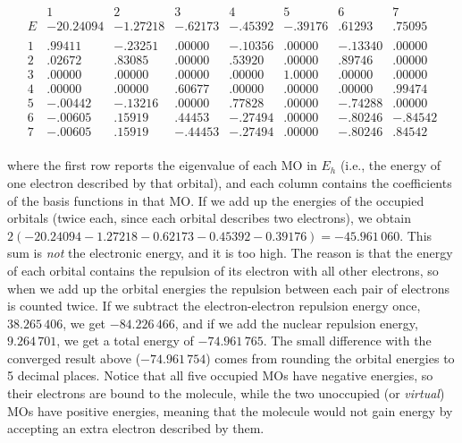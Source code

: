 \documentclass[
  english,
  9pt,
]{extbook}
\theoremstyle{definition}
\theoremstyle{definition}
\theoremstyle{definition}
\theoremstyle{definition}
\theoremstyle{remark}
\begin{document}
\begin{equation}
\begin{matrix}                  
& 1 & 2 & 3 & 4 & 5 & 6 & 7 \\
E  & -20.24094 &  -1.27218   &   -.62173    &  -.45392     &    -.39176    &   .61293    & .75095 \\
\\
1                & .99411    &   -.23251   &   .00000     &  -.10356     &    .00000     &   -.13340   & .00000   \\
2                & .02672    &   .83085    &  .00000      & .53920       &  .00000      &  .89746     & .00000  \\
3                & .00000    &   .00000    &  .00000      & .00000       &  1.0000       & .00000      & .00000  \\
4                & .00000    &   .00000    & .60677       &  .00000      &   .00000      &  .00000     & .99474  \\
5                & -.00442   &    -.13216  &    .00000    &   .77828     &    .00000     &  -.74288    &  .00000  \\
6                & -.00605   &    .15919   &   .44453     &  -.27494     &    .00000     &  -.80246    &  -.84542  \\
7                &  -.00605  &     .15919  &     -.44453  &     -.27494  &       .00000  &     -.80246 &     .84542 \\
\end{matrix}
\label{eq:eigenvalMO}
\end{equation}

where the first row reports the eigenvalue of each MO in \(E_h\) (i.e., the energy of one electron described by that orbital), and each column contains the coefficients of the basis functions in that MO. If we add up the energies of the occupied orbitals (twice each, since each orbital describes two electrons), we obtain \(2(-20.24094{-}1.27218{-}0.62173{-}0.45392{-}0.39176)=-45.961\,060\). This sum is \emph{not} the electronic energy, and it is too high. The reason is that the energy of each orbital contains the repulsion of its electron with all other electrons, so when we add up the orbital energies the repulsion between each pair of electrons is counted twice. If we subtract the electron-electron repulsion energy once, \(38.265\,406\), we get \(-84.226\,466\), and if we add the nuclear repulsion energy, \(9.264\,701\), we get a total energy of \(-74.961\,765\). The small difference with the converged result above (\(-74.961\,754\)) comes from rounding the orbital energies to 5 decimal places. Notice that all five occupied MOs have negative energies, so their electrons are bound to the molecule, while the two unoccupied (or \emph{virtual}) MOs have positive energies, meaning that the molecule would not gain energy by accepting an extra electron described by them.
\end{document}
